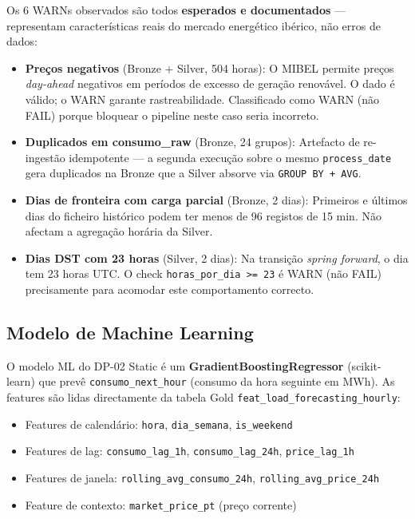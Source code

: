 \documentclass[11pt,a4paper]{article}
\begin{document}
Os 6 WARNs observados são todos \textbf{esperados e documentados} — representam características reais do mercado energético ibérico, não erros de dados:

\begin{itemize}[leftmargin=*,noitemsep]
  \item \textbf{Preços negativos} (Bronze + Silver, 504 horas): O MIBEL permite preços \textit{day-ahead} negativos em períodos de excesso de geração renovável. O dado é válido; o WARN garante rastreabilidade. Classificado como WARN (não FAIL) porque bloquear o pipeline neste caso seria incorreto.
  \item \textbf{Duplicados em consumo\_raw} (Bronze, 24 grupos): Artefacto de re-ingestão idempotente — a segunda execução sobre o mesmo \texttt{process\_date} gera duplicados na Bronze que a Silver absorve via \texttt{GROUP BY + AVG}.
  \item \textbf{Dias de fronteira com carga parcial} (Bronze, 2 dias): Primeiros e últimos dias do ficheiro histórico podem ter menos de 96 registos de 15 min. Não afectam a agregação horária da Silver.
  \item \textbf{Dias DST com 23 horas} (Silver, 2 dias): Na transição \textit{spring forward}, o dia tem 23 horas UTC. O check \texttt{horas\_por\_dia >= 23} é WARN (não FAIL) precisamente para acomodar este comportamento correcto.
\end{itemize}

\subsection{Modelo de Machine Learning}

O modelo ML do DP-02 Static é um \textbf{GradientBoostingRegressor} (scikit-learn) que prevê \texttt{consumo\_next\_hour} (consumo da hora seguinte em MWh). As features são lidas directamente da tabela Gold \texttt{feat\_load\_forecasting\_hourly}:

\begin{itemize}[leftmargin=*,noitemsep]
  \item Features de calendário: \texttt{hora}, \texttt{dia\_semana}, \texttt{is\_weekend}
  \item Features de lag: \texttt{consumo\_lag\_1h}, \texttt{consumo\_lag\_24h}, \texttt{price\_lag\_1h}
  \item Features de janela: \texttt{rolling\_avg\_consumo\_24h}, \texttt{rolling\_avg\_price\_24h}
  \item Feature de contexto: \texttt{market\_price\_pt} (preço corrente)
\end{itemize}
\end{document}
